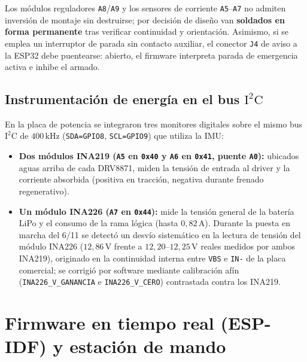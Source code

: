 \documentclass[11pt,a4paper]{report}
\newcommand{\ud}[1]{\,\mathrm{#1}}
\begin{document}
\begin{ojo}
Los módulos reguladores \texttt{A8}/\texttt{A9} y los sensores de corriente \texttt{A5}--\texttt{A7}
no admiten inversión de montaje sin destruirse; por decisión de diseño van \textbf{soldados en
forma permanente} tras verificar continuidad y orientación. Asimismo, si se emplea un
interruptor de parada sin contacto auxiliar, el conector \texttt{J4} de aviso a la ESP32 debe
puentearse: abierto, el firmware interpreta parada de emergencia activa e inhibe el armado.
\end{ojo}

\section{Instrumentación de energía en el bus $\text{I}^2\text{C}$}

En la placa de potencia se integraron tres monitores digitales sobre el mismo bus $\text{I}^2\text{C}$
de $400\ud{kHz}$ (\texttt{SDA=GPIO8}, \texttt{SCL=GPIO9}) que utiliza la IMU:

\begin{itemize}[leftmargin=1.5em]
\item \textbf{Dos módulos INA219 (\texttt{A5} en \texttt{0x40} y \texttt{A6} en \texttt{0x41}, puente \texttt{A0}):}
      ubicados aguas arriba de cada DRV8871, miden la tensión de entrada al driver y la
      corriente absorbida (positiva en tracción, negativa durante frenado regenerativo).
\item \textbf{Un módulo INA226 (\texttt{A7} en \texttt{0x44}):} mide la tensión general de la
      batería LiPo y el consumo de la rama lógica (hasta $0{,}82\ud{A}$). Durante la puesta en
      marcha del 6/11 se detectó un desvío sistemático en la lectura de tensión del módulo
      INA226 ($12{,}86\ud{V}$ frente a $12{,}20\text{--}12{,}25\ud{V}$ reales medidos por ambos
      INA219), originado en la continuidad interna entre \texttt{VBS} e \texttt{IN-} de la placa
      comercial; se corrigió por software mediante calibración afín
      (\texttt{INA226\_V\_GANANCIA} e \texttt{INA226\_V\_CERO}) contrastada contra los INA219.
\end{itemize}

\chapter{Firmware en tiempo real (ESP-IDF) y estación de mando}\label{cap:fw}
\end{document}
